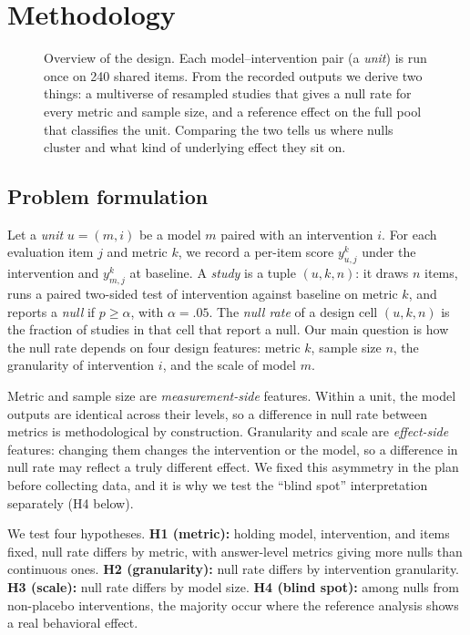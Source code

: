 \section{Methodology}
\label{sec:method}

\begin{figure}[t]
    \centering
    \resizebox{0.98\linewidth}{!}{}
    \caption{Overview of the design. Each model--intervention pair (a \emph{unit}) is run once on 240 shared items. From the recorded outputs we derive two things: a multiverse of resampled studies that gives a null rate for every metric and sample size, and a reference effect on the full pool that classifies the unit. Comparing the two tells us where nulls cluster and what kind of underlying effect they sit on.}
    \label{fig:overview}
\end{figure}

\subsection{Problem formulation}
\label{sec:formulation}

Let a \emph{unit} $u = (m, i)$ be a model $m$ paired with an intervention $i$.
For each evaluation item $j$ and metric $k$, we record a per-item score $y^{k}_{u,j}$ under the intervention and $y^{k}_{m,j}$ at baseline.
A \emph{study} is a tuple $(u, k, n)$: it draws $n$ items, runs a paired two-sided test of intervention against baseline on metric $k$, and reports a \emph{null} if $p \ge \alpha$, with $\alpha = .05$.
The \emph{null rate} of a design cell $(u, k, n)$ is the fraction of studies in that cell that report a null.
Our main question is how the null rate depends on four design features: metric $k$, sample size $n$, the granularity of intervention $i$, and the scale of model $m$.

Metric and sample size are \emph{measurement-side} features.
Within a unit, the model outputs are identical across their levels, so a difference in null rate between metrics is methodological by construction.
Granularity and scale are \emph{effect-side} features: changing them changes the intervention or the model, so a difference in null rate may reflect a truly different effect.
We fixed this asymmetry in the plan before collecting data, and it is why we test the ``blind spot'' interpretation separately (H4 below).

We test four hypotheses.
{\bf H1 (metric):} holding model, intervention, and items fixed, null rate differs by metric, with answer-level metrics giving more nulls than continuous ones.
{\bf H2 (granularity):} null rate differs by intervention granularity.
{\bf H3 (scale):} null rate differs by model size.
{\bf H4 (blind spot):} among nulls from non-placebo interventions, the majority occur where the reference analysis shows a real behavioral effect.

